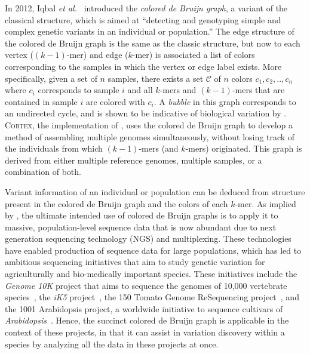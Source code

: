 In 2012, Iqbal {\it et al.}~\cite{ICTFM12} introduced the \emph{colored de Bruijn graph}, a variant of the classical structure, which is aimed at ``detecting and genotyping simple and complex genetic variants in an individual or population.'' The edge structure of the colored de Bruijn graph is the same as the classic structure, but now to each vertex ($(k - 1)$-mer) and edge ($k$-mer)
is associated a list of colors corresponding to the samples in which the vertex or edge label exists. More specifically, given a set of $n$ samples, there exists a set $\mathcal{C}$ of $n$ colors $c_1, c_2, .., c_n$ where $c_i$ corresponds to sample $i$ and all $k$-mers and $(k-1)$-mers that are contained in sample $i$ are colored with $c_i$. A \emph{bubble} in this graph corresponds to an undirected cycle, and is shown to be indicative of biological variation by \cite{ICTFM12}.
\textsc{Cortex}, the implementation of \cite{ICTFM12}, uses the colored de Bruijn graph to develop a method of assembling multiple genomes simultaneously, without losing track of the individuals from which $(k - 1)$-mers (and $k$-mers) originated. This graph is derived from either multiple reference genomes, multiple samples, or a combination of both.

Variant information of an individual or population can be deduced from structure present in the colored de Bruijn graph and the colors of each $k$-mer.
As implied by \cite{ICTFM12}, the ultimate intended use of colored de Bruijn graphs is to apply it to massive, population-level sequence data that is now abundant due to next generation sequencing technology (NGS) and multiplexing. These technologies have enabled production of sequence data for large populations, which has led to ambitious sequencing initiatives that aim to study genetic variation for agriculturally and bio-medically important species.  These initiatives include the \emph{Genome 10K} project that aims to sequence the genomes of 10,000 vertebrate species~\citep{Haussler:2009}, the \emph{iK5} project~\citep{Robinson:2011}, the 150 Tomato Genome ReSequencing project~\citep{tomato1,tomato2}, and the 1001 Arabidopsis project, a worldwide initiative to sequence cultivars of \emph{Arabidopsis}~\citep{arabidopsis}.  Hence, the succinct colored de Bruijn graph is applicable in the context of these projects, in that it can assist in variation discovery within a species by analyzing all the data in these projects at once.

